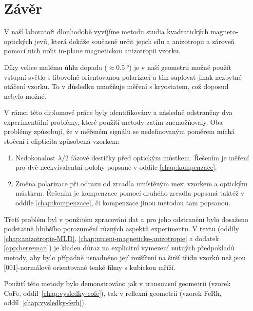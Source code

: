 \chapter*{Závěr}

V naší laboratoři dlouhodobě vyvíjíme metodu studia kvadratických mag\-ne\-to-optických jevů, která dokáže současně určit jejich sílu a anizotropii a zároveň pomocí nich určit in-plane magnetickou anizotropii vzorku.

Díky velice malému úhlu dopadu ($\approx\SI{0.5}{\degree}$) je v naší geometrii možné použít vstupní světlo s libovolně orientovanou polarizací a tím suplovat jinak nezbytné otáčení vzorku.
To v důsledku umožňuje měření s kryostatem, což doposud nebylo možné.

V rámci této diplomové práce byly identifikovány a následně odstraněny dva experimentální problémy, které použití metody zatím znemožňovaly.
Oba problémy způsobují, že v měřeném signálu se nedefinovaným poměrem míchá stočení i elipticita způsobená vzorkem:
\begin{enumerate}
    \item Nedokonalost $\lambda/2$ fázové destičky před optickým můstkem. 
        Řešením je měření pro dvě neekvivalentní polohy popsané v oddíle \ref{chap:kompenzace}.
    \item Změna polarizace při odrazu od zrcadla umístěným mezi vzorkem a optickým můstkem.
        Řešením je kompenzace pomocí druhého zrcadla popsaná taktéž v oddíle \ref{chap:kompenzace}, či kompenzace jinou metodou tam popsanou.
\end{enumerate}

Třetí problém byl v použitém zpracování dat a pro jeho odstranění bylo dosaženo podstatně hlubšího porozumění různých aspektů experimentu.
V textu (oddíly \ref{chap:anizotropie-MLD}, \ref{chap:urceni-magneticke-anizotropie} a dodatek \ref{app:berreman}) je kladen důraz na explicitní vymezení nutných předpokladů metody, aby bylo případně usnadněno její rozšíření na širší třídu vzorků než jsou [001]-normálově orientované tenké filmy s kubickou mříží.

Použití této metody bylo demonstrováno jak v transmisní geometrii (vzorek CoFe, oddíl~\ref{chap:vysledky-cofe}), tak v reflexní geometrii (vzorek FeRh, oddíl~\ref{chap:vysledky-ferh}).
